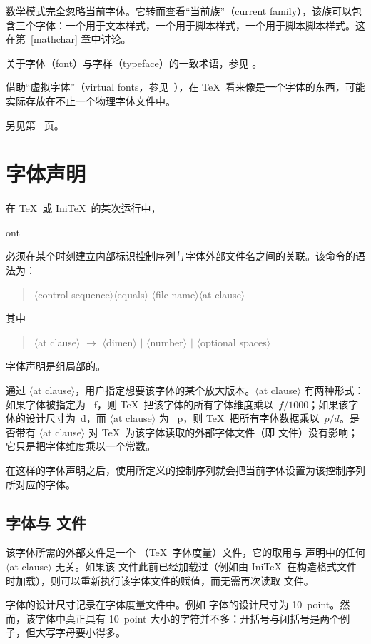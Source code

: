 \documentclass[a4paper]{rapport3}
\makeatletter
\def\gr#1{$\langle$#1$\rangle$}\def\key#1{{\tt#1}}
\def\alt{}\def\altt{}%
\def\IniTeX{Ini\TeX}\def\LamsTeX{LAMS\TeX}\def\VirTeX{Vir\TeX}
\newenvironment{disp}{\begin{quotation}}{\end{quotation}}
\def\cstoidx#1\par{\index{#1@\cs{#1}}}
\makeatother
\begin{document}
数学模式完全忽略当前字体。它转而查看“当前族”（current family），该族可以包含三个字体：一个用于文本样式，一个用于脚本样式，一个用于脚本脚本样式。这在第~\ref{mathchar} 章中讨论。
\awp

关于字体（font）与字样（typeface）的一致术语，参见 \cite{S}。

借助“虚拟字体”（virtual fonts，参见~\cite{K:virt}），在 \TeX\ 看来像是一个字体的东西，可能实际存放在不止一个物理字体文件中。
\alt
另见第~\pageref{virtual:fonts} 页。

\section{字体声明}

在 \TeX\ 或 \IniTeX\ 的某次运行中，
\cstoidx font\par
必须在某个时刻建立内部标识控制序列与字体外部文件名之间的关联。该命令的语法为：
\begin{disp}\gr{control sequence}\gr{equals}%
\gr{file name}\gr{at clause}\end{disp}
其中
\begin{disp}\gr{at clause} $\longrightarrow$  \gr{dimen}
$|$  \gr{number} $|$ \gr{optional spaces}\end{disp}
字体声明是组局部的。

通过 \gr{at clause}，用户指定想要该字体的某个放大版本。\gr{at clause} 有两种形式：如果字体被指定为 ~{\italic f\/}，则 \TeX\ 把该字体的所有字体维度乘以~$f/1000$；如果该字体的设计尺寸为~{\italic d\/}，而 \gr{at clause} 为 ~{\italic p\/}，则 \TeX\ 把所有字体数据乘以~$p/d$。是否带有 \gr{at clause} 对 \TeX\ 为该字体读取的外部字体文件（即  文件）没有影响；它只是把字体维度乘以一个常数。


在这样的字体声明之后，使用所定义的控制序列就会把当前字体设置为该控制序列所对应的字体。

\subsection{字体与  文件}

该字体所需的外部文件是一个 （\TeX\ 字体度量）文件，它的取用与  声明中的任何 \gr{at clause} 无关。如果该  文件此前已经加载过（例如由 \IniTeX\ 在构造格式文件时加载），则可以重新执行该字体文件的赋值，而无需再次读取  文件。

字体的设计尺寸记录在字体度量文件中。例如  字体的设计尺寸为 10~point。然而，该字体中真正具有 10~point 大小的字符并不多：开括号与闭括号是两个例子，但大写字母要小得多。
\end{document}
